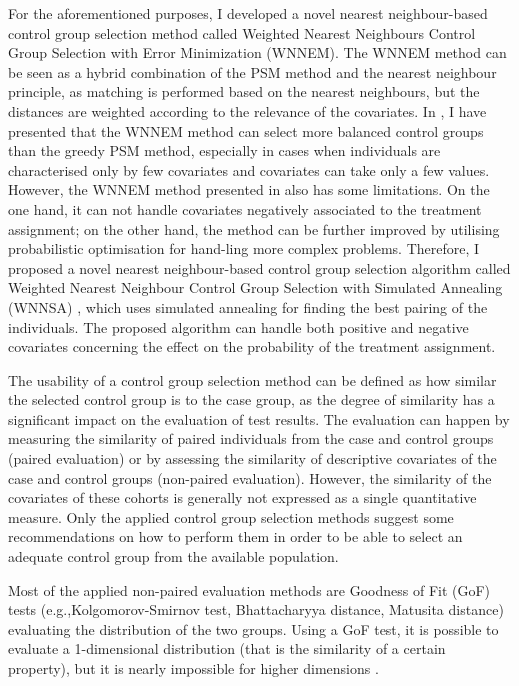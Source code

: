 For the aforementioned purposes, I developed a novel nearest neighbour-based control group selection method called Weighted Nearest Neighbours Control Group Selection with Error Minimization (WNNEM). The WNNEM method can be seen as a hybrid combination of the PSM method and the nearest neighbour principle, as matching is performed based on the nearest neighbours, but the distances are weighted according to the relevance of the covariates. In \cite{szeker2020weighted}, I have presented that the WNNEM method can select more balanced control groups than the greedy PSM method, especially in cases when individuals are characterised only by few covariates and covariates can take only a few values. However, the WNNEM method presented in \cite{szeker2020weighted} also has some limitations. On the one hand, it can not handle covariates negatively associated to the treatment assignment; on the other hand, the method can be further improved by utilising probabilistic optimisation for hand-ling more complex problems. Therefore, I proposed a novel nearest neighbour-based control group selection algorithm called Weighted Nearest Neighbour Control Group Selection with Simulated Annealing (WNNSA) \cite{szeker2021optimized}, which uses simulated annealing for finding the best pairing of the individuals. The proposed algorithm can handle both positive and negative covariates concerning the effect on the probability of the treatment assignment.

The usability of a control group selection method can be defined as how similar the selected control group is to the case group, as the degree of similarity has a significant impact on the evaluation of test results. The evaluation can happen by measuring the similarity of paired individuals from the case and control groups (paired evaluation) or by assessing the similarity of descriptive covariates of the case and control groups (non-paired evaluation). However, the similarity of the covariates of these cohorts is generally not expressed as a single quantitative measure. Only the applied control group selection methods suggest some recommendations on how to perform them in order to be able to select an adequate control group from the available population.

Most of the applied non-paired evaluation methods are Goodness of Fit (GoF) tests (e.g.,Kolgomorov-Smirnov test, Bhattacharyya distance, Matusita distance) \cite{mielke2007permutation, berry2011permutation} evaluating the distribution of the two groups. Using a GoF test, it is possible to evaluate a 1-dimensional distribution (that is the similarity of a certain property), but it is nearly impossible for higher dimensions \cite{fasano1987multidimensional}.

